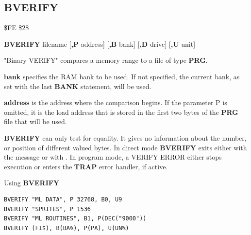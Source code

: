 
\newpage
\subsection{BVERIFY}
\begin{description}[leftmargin=2cm,style=nextline]
\item [Token:] \$FE \$28
\item [Format:] {\bf BVERIFY} filename [{\bf,P} address]
                [{\bf,B} bank] [{\bf,D} drive] [{\bf,U} unit]
\item [Usage:]
   "Binary VERIFY" compares a memory range to
   a file of type {\bf PRG}.

   \filenamedefinition

   {\bf bank} specifies the RAM bank to be used.
   If not specified, the current bank, as set with the last
   {\bf BANK} statement, will be used.

   {\bf address} is the address where the comparison begins.
   If the parameter P is omitted, it is the load address
   that is stored in the first two bytes of the {\bf PRG} file that will be used.

   \drivedefinition

   \unitdefinition

\item [Remarks:]
   {\bf BVERIFY} can only test for equality. It gives no information
   about the number, or position of different valued bytes.
   In direct mode {\bf BVERIFY} exits either with the message 
   or with . In program mode, a VERIFY ERROR
   either stops execution or enters the {\bf TRAP} error handler,
   if active.

\item [Examples:] Using {\bf BVERIFY}
\begin{tcolorbox}[colback=black,coltext=white]
\verbatimfont{\codefont}
\begin{verbatim}
BVERIFY "ML DATA", P 32768, B0, U9
BVERIFY "SPRITES", P 1536
BVERIFY "ML ROUTINES", B1, P(DEC("9000"))
BVERIFY (FI$), B(BA%), P(PA), U(UN%)
\end{verbatim}
\end{tcolorbox}
\end{description}


\newpage
